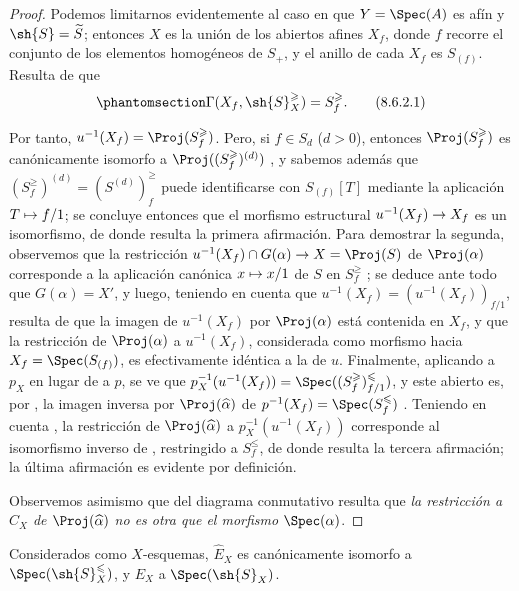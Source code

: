 \documentclass[oneside,10pt]{amsart}
\makeatletter
\renewcommand{\leq}{\leqslant}
\renewcommand{\geq}{\geqslant}
\newcommand{\ega@arrow}[2]{\mathchoice{#1}{#2}{#2}{#2}}
\let\ega@shortmapsto\mapsto
\renewcommand{\to}{\ega@arrow{\longrightarrow}{\rightarrow}}
\renewcommand{\mapsto}{\ega@arrow{\longmapsto}{\ega@shortmapsto}}
\newcommand{\oldpage}[2][]{\marginnote{\normalfont\footnotesize\textbf{#1}~|~#2}\ignorespaces}
\let\EGAOriginalLabel\label
\renewcommand{\label}[1]{\phantomsection\EGAOriginalLabel{#1}}
\newcommand*{\ega@labelnumber}[1]{\StrBehind{#1}{.}}
\newcommand{\eref}[1]{\hyperref[#1]{\normalfont{(\ega@labelnumber{#1})}}}
\makeatother
\begin{document}
\begin{proof}
Podemos limitarnos evidentemente al caso en que $Y=\Spec(A)$ es afín y $\sh{S}=\widetilde{S}$;
entonces $X$ es la unión de los abiertos afines $X_f$, donde $f$ recorre el conjunto de los elementos homogéneos de $S_+$, y el anillo de cada $X_f$ es $S_{(f)}$.
Resulta de  que
\[
\label{II.8.6.2.1}
  \Gamma(X_f, \sh{S}_X^\geq) = S_f^\geq.
\tag{8.6.2.1}
\]

Por tanto, $u^{-1}(X_f)=\Proj(S_f^\geq)$.
Pero, si $f\in S_d$ ($d>0$), entonces $\Proj(S_f^\geq)$ es canónicamente isomorfo a $\Proj((S_f^\geq)^{(d)})$ , y sabemos además que $(S_f^\geq)^{(d)}=(S^{(d)})_f^\geq$ puede identificarse con $S_{(f)}[T]$  mediante la aplicación $T\mapsto f/1$;
se concluye entonces  que el morfismo estructural $u^{-1}(X_f)\to X_f$ es un isomorfismo, de donde resulta la primera afirmación.
Para demostrar la segunda, observemos que la restricción $u^{-1}(X_f)\cap G(\alpha)\to X=\Proj(S)$ de $\Proj(\alpha)$ corresponde a la aplicación canónica $x\mapsto x/1$ de $S$ en $S_f^\geq$ ;
se deduce ante todo que $G(\alpha)=X'$, y luego, teniendo en cuenta que $u^{-1}(X_f)=(u^{-1}(X_f))_{f/1}$, resulta de  que la imagen de $u^{-1}(X_f)$ por $\Proj(\alpha)$ está contenida en $X_f$, y que la restricción de $\Proj(\alpha)$ a $u^{-1}(X_f)$, considerada como morfismo hacia $X_f=\Spec(S_{(f)})$, es efectivamente idéntica a la de $u$.
Finalmente, aplicando  a $p_X$ en lugar de a $p$, se ve que $p_X^{-1}(u^{-1}(X_f)) = \Spec((S_f^\geq)_{f/1}^\leq)$, y este abierto es, por , la imagen inversa por $\Proj(\widehat{\alpha})$ de $p^{-1}(X_f)=\Spec(S_f^\leq)$ .
Teniendo en cuenta , la restricción de $\Proj(\widehat{\alpha})$ a $p_X^{-1}(u^{-1}(X_f))$ corresponde al isomorfismo inverso de , restringido a $S_f^\leq$, de donde resulta la tercera afirmación;
la última afirmación es evidente por definición.

\oldpage[II]{173}
Observemos asimismo que del diagrama conmutativo \eref{eq:2.8.5.3.2} resulta que \emph{la restricción a $C_X$ de $\Proj(\widehat{\alpha})$ no es otra que el morfismo $\Spec(\alpha)$}.
\end{proof}
\begin{corollary}[8.6.3]
\label{II.8.6.3}
Considerados como $X$-esquemas, $\widehat{E}_X$ es canónicamente isomorfo a $\Spec(\sh{S}_X^\leq)$, y $E_X$ a $\Spec(\sh{S}_X)$.
\end{corollary}
\end{document}
